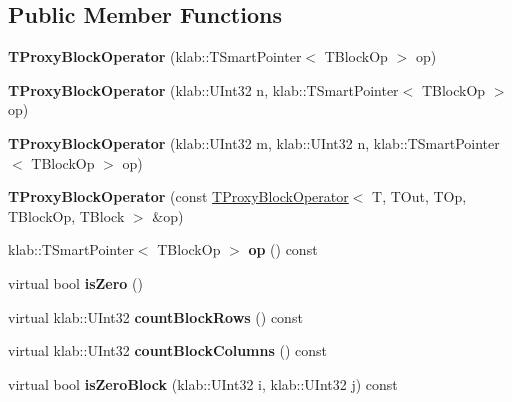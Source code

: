 \subsection*{Public Member Functions}
\begin{DoxyCompactItemize}
\item 
{\bfseries T\+Proxy\+Block\+Operator} (klab\+::\+T\+Smart\+Pointer$<$ T\+Block\+Op $>$ op)\hypertarget{classkl1p_1_1TProxyBlockOperator_a9f2931a2cd783edf34832d80a9b8512c}{}\label{classkl1p_1_1TProxyBlockOperator_a9f2931a2cd783edf34832d80a9b8512c}

\item 
{\bfseries T\+Proxy\+Block\+Operator} (klab\+::\+U\+Int32 n, klab\+::\+T\+Smart\+Pointer$<$ T\+Block\+Op $>$ op)\hypertarget{classkl1p_1_1TProxyBlockOperator_a0840280fa53c061be82fd92bb786fb70}{}\label{classkl1p_1_1TProxyBlockOperator_a0840280fa53c061be82fd92bb786fb70}

\item 
{\bfseries T\+Proxy\+Block\+Operator} (klab\+::\+U\+Int32 m, klab\+::\+U\+Int32 n, klab\+::\+T\+Smart\+Pointer$<$ T\+Block\+Op $>$ op)\hypertarget{classkl1p_1_1TProxyBlockOperator_a042fb421016f27317c5768d5cc4d4080}{}\label{classkl1p_1_1TProxyBlockOperator_a042fb421016f27317c5768d5cc4d4080}

\item 
{\bfseries T\+Proxy\+Block\+Operator} (const \hyperlink{classkl1p_1_1TProxyBlockOperator}{T\+Proxy\+Block\+Operator}$<$ T, T\+Out, T\+Op, T\+Block\+Op, T\+Block $>$ \&op)\hypertarget{classkl1p_1_1TProxyBlockOperator_aa7e68aae3533db29b4dc9b7fc2dd2622}{}\label{classkl1p_1_1TProxyBlockOperator_aa7e68aae3533db29b4dc9b7fc2dd2622}

\item 
klab\+::\+T\+Smart\+Pointer$<$ T\+Block\+Op $>$ {\bfseries op} () const \hypertarget{classkl1p_1_1TProxyBlockOperator_a33aa5dacca9fd1f08ae9b2d9f42e463d}{}\label{classkl1p_1_1TProxyBlockOperator_a33aa5dacca9fd1f08ae9b2d9f42e463d}

\item 
virtual bool {\bfseries is\+Zero} ()\hypertarget{classkl1p_1_1TProxyBlockOperator_af1ac0c246fc3a87e8ee52f3f31d3a6b1}{}\label{classkl1p_1_1TProxyBlockOperator_af1ac0c246fc3a87e8ee52f3f31d3a6b1}

\item 
virtual klab\+::\+U\+Int32 {\bfseries count\+Block\+Rows} () const \hypertarget{classkl1p_1_1TProxyBlockOperator_aeae47cfded8c43b61f503835433bc59b}{}\label{classkl1p_1_1TProxyBlockOperator_aeae47cfded8c43b61f503835433bc59b}

\item 
virtual klab\+::\+U\+Int32 {\bfseries count\+Block\+Columns} () const \hypertarget{classkl1p_1_1TProxyBlockOperator_a7cdade1bdda62b6eafac72f05fe19928}{}\label{classkl1p_1_1TProxyBlockOperator_a7cdade1bdda62b6eafac72f05fe19928}

\item 
virtual bool {\bfseries is\+Zero\+Block} (klab\+::\+U\+Int32 i, klab\+::\+U\+Int32 j) const \hypertarget{classkl1p_1_1TProxyBlockOperator_a1c75834784b1b112cab736d3fbaecead}{}\label{classkl1p_1_1TProxyBlockOperator_a1c75834784b1b112cab736d3fbaecead}

\end{DoxyCompactItemize}
